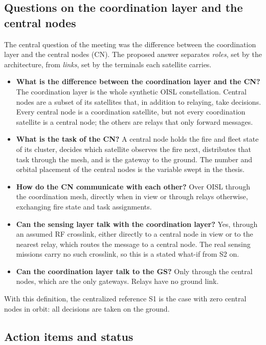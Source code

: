 \documentclass[11pt]{article}
\begin{document}
\subsection{Questions on the coordination layer and the central nodes}\label{subsec:cn_questions}

The central question of the meeting was the difference between the coordination layer and the central nodes (CN). The proposed answer separates \emph{roles}, set by the architecture, from \emph{links}, set by the terminals each satellite carries.

\begin{itemize}[leftmargin=1.2cm]
    \item \textbf{What is the difference between the coordination layer and the CN?} The coordination layer is the whole synthetic OISL constellation. Central nodes are a subset of its satellites that, in addition to relaying, take decisions. Every central node is a coordination satellite, but not every coordination satellite is a central node; the others are relays that only forward messages.
    \item \textbf{What is the task of the CN?} A central node holds the fire and fleet state of its cluster, decides which satellite observes the fire next, distributes that task through the mesh, and is the gateway to the ground. The number and orbital placement of the central nodes is the variable swept in the thesis.
    \item \textbf{How do the CN communicate with each other?} Over OISL through the coordination mesh, directly when in view or through relays otherwise, exchanging fire state and task assignments.
    \item \textbf{Can the sensing layer talk with the coordination layer?} Yes, through an assumed RF crosslink, either directly to a central node in view or to the nearest relay, which routes the message to a central node. The real sensing missions carry no such crosslink, so this is a stated what-if from S2 on.
    \item \textbf{Can the coordination layer talk to the GS?} Only through the central nodes, which are the only gateways. Relays have no ground link.
\end{itemize}

With this definition, the centralized reference S1 is the case with zero central nodes in orbit: all decisions are taken on the ground.

\subsection{Action items and status}\label{subsec:actions20oct}
\end{document}
